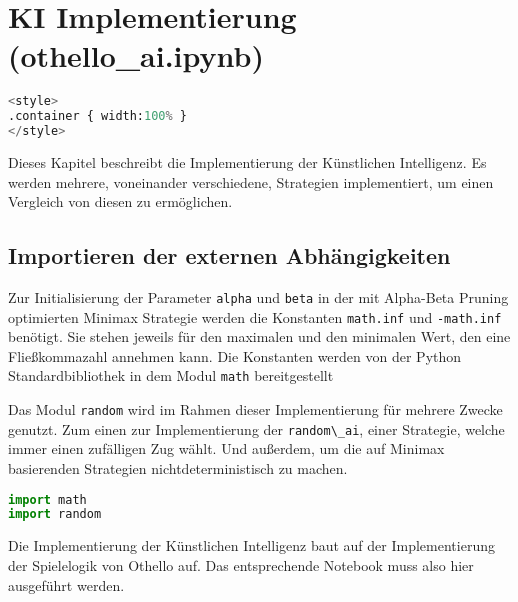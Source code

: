 \hypertarget{ki-implementierung-othello_ai.ipynb}{%
\section{KI Implementierung
(othello\_ai.ipynb)}\label{ki-implementierung-othello_ai.ipynb}}

\label{sec:aiimpl}

\begin{lstlisting}[language=Python]
%%HTML
<style>
.container { width:100% }
</style>
\end{lstlisting}

Dieses Kapitel beschreibt die Implementierung der Künstlichen
Intelligenz. Es werden mehrere, voneinander verschiedene, Strategien
implementiert, um einen Vergleich von diesen zu ermöglichen.

\hypertarget{importieren-der-externen-abhuxe4ngigkeiten}{%
\subsection{Importieren der externen
Abhängigkeiten}\label{importieren-der-externen-abhuxe4ngigkeiten}}

Zur Initialisierung der Parameter \passthrough{\lstinline!alpha!} und
\passthrough{\lstinline!beta!} in der mit Alpha-Beta Pruning optimierten
Minimax Strategie werden die Konstanten
\passthrough{\lstinline!math.inf!} und
\passthrough{\lstinline!-math.inf!} benötigt. Sie stehen jeweils für den
maximalen und den minimalen Wert, den eine Fließkommazahl annehmen kann.
Die Konstanten werden von der Python Standardbibliothek in dem Modul
\passthrough{\lstinline!math!} bereitgestellt

Das Modul \passthrough{\lstinline!random!} wird im Rahmen dieser
Implementierung für mehrere Zwecke genutzt. Zum einen zur
Implementierung der \passthrough{\lstinline!random\_ai!}, einer
Strategie, welche immer einen zufälligen Zug wählt. Und außerdem, um die
auf Minimax basierenden Strategien nichtdeterministisch zu machen.

\begin{lstlisting}[language=Python]
import math
import random
\end{lstlisting}

Die Implementierung der Künstlichen Intelligenz baut auf der
Implementierung der Spielelogik von Othello auf. Das entsprechende
Notebook muss also hier ausgeführt werden.

\begin{lstlisting}[language=Python]
%run othello_game.ipynb
\end{lstlisting}

